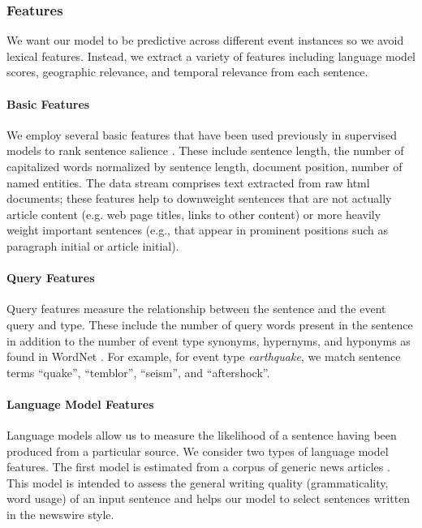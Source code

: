 

\subsubsection{Features}
We want our model to be predictive across different event instances so we avoid lexical features.  Instead, we extract a variety of features including language model scores, geographic relevance, and temporal relevance from each sentence.  

\paragraph{Basic Features}

We employ several basic features that have been used previously in supervised models to rank sentence salience \cite{kupiec1995trainable,conroy2001using}. These include sentence length, the number of capitalized words normalized by sentence length, document position, number of named entities.  
The data stream comprises text extracted from raw html documents;
these features help to downweight sentences that are not actually article 
content (e.g. web page titles, links to other content) or
more heavily weight important sentences (e.g., that appear in
prominent positions such as paragraph initial or article initial).

\paragraph{Query Features}

Query features measure the relationship between the sentence and the event query and type.  These include the number of query words present in the sentence in addition to the number of event type synonyms, hypernyms, and hyponyms as found in WordNet \cite{miller1995wordnet}.  
For example, for event type \emph{earthquake},  we match sentence terms 
``quake'', ``temblor'', ``seism'', and ``aftershock''.

\paragraph{Language Model Features}\label{subsubsec:lm}
Language models allow us to measure the likelihood of a sentence having been 
produced from a particular source.  We consider two types of language model 
features.  The first model is estimated from a corpus of generic news 
articles .  
This model is intended to assess the general writing quality (grammaticality, word usage) of an input sentence and helps our model to select sentences
written in the newswire style.  

